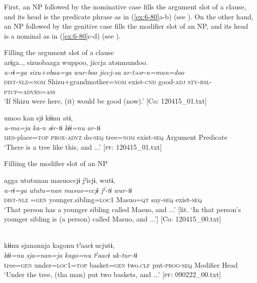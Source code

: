 First, an NP followed by the nominative case fills the argument slot of a clause, and its head is the predicate phrase as in (\ref{ex:6-80}a-b) (see ). On the other hand, an NP followed by the genitive case fills the modifier slot of an NP, and its head is a nominal as in (\ref{ex:6-80}c-d) (see ).

\ea\label{ex:6-80}
 Filling the argument slot of a clause\\

 \ea {\TM}  arɨga..,  sizuobaaga  wuppoo,  jiccja   atənmundoo.\\
\gllll \textit{a-rɨ=ga}  \textit{sizu+obaa=ga}  \textit{wur-boo}  \textit{jiccj-sa}  \textit{ar-təər-n=mun=doo}\\
\textsc{dist}-\textsc{nlz}=\textsc{nom}  Shizu+grandmother=\textsc{nom}  exist-\textsc{cnd}  good-\textsc{adj} \textsc{stv}-\textsc{rsl}-\textsc{ptcp}=\textsc{advrs}=\textsc{ass}\\
\glt ‘If Shizu were here, (it) would be good (now).’ [Co: 120415\_01.txt]
\z

\ex {\TM}  umoo  kan  sjɨ  kɨɨnu  atɨ,\\
\gllll \textit{u-ma=ja}  \textit{ka-n}  \textit{sɨr-tɨ}  \textit{kɨɨ=nu}  \textit{ar-tɨ}\\
\textsc{mes}-place=\textsc{top}  \textsc{prox}-\textsc{advz}  do-\textsc{seq}  tree=\textsc{nom}  exist-\textsc{seq}
            Argument  Predicate\\
\glt ‘There is a tree like this, and ...’ [\textsc{pf}: 120415\_01.txt]
\z

  Filliing the modifier slot of an NP

\ex {\TM}  agga  ututunan  masuoccjɨ  jˀicjɨ,      wutɨ,\\
\gllll \textit{a-rɨ=ga}  \textit{ututu=nan}  \textit{masuo=ccjɨ}  \textit{jˀ-tɨ}      \textit{wur-tɨ}\\
\textsc{dist}-\textsc{nlz} =\textsc{gen}  younger.sibling=\textsc{loc1}  Masuo=\textsc{qt}  say-\textsc{seq}   exist-\textsc{seq}\\
\glt ‘That person has a younger sibling called Masuo, and ...’
[lit. ‘In that person’s younger sibling is (a person) called Masuo, and ...’]      [Co: 120415\_00.txt]
\z

\ex\relax[= (\ref{ex:6-62}a)]\\
{\TM}
\gllll  kɨɨnu  sjanannja  kagonu  tˀaacɨ  ucjutɨ,\\
\textit{kɨɨ=nu}  \textit{sja=nan=ja}  \textit{kago=nu}  \textit{tˀaacɨ}  \textit{uk-tur-tɨ}\\
tree=\textsc{gen}  under=\textsc{loc1}=\textsc{top}  basket=\textsc{gen}  two.\textsc{clf}  put-\textsc{prog}-\textsc{seq}
      Modifier  Head      \\
\glt ‘Under the tree, (tha man) put two baskets, and ...’ [\textsc{pf}: 090222\_00.txt]
\z

